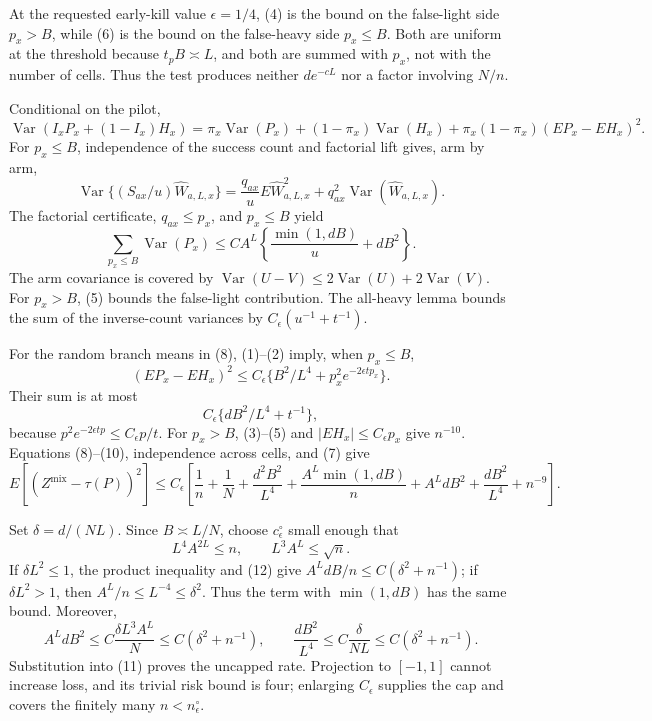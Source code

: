 At the requested early-kill value \(\epsilon=1/4\), (4) is the bound on the false-light side \(p_x>B\), while (6) is the bound on the false-heavy side \(p_x\le B\).  Both are uniform at the threshold because \(t_pB\asymp L\), and both are summed with \(p_x\), not with the number of cells.  Thus the test produces neither \(d e^{-cL}\) nor a factor involving \(N/n\).

Conditional on the pilot,
\[
 \operatorname{Var}(I_xP_x+(1-I_x)H_x)
 =\pi_x\operatorname{Var}(P_x)+(1-\pi_x)\operatorname{Var}(H_x)
 +\pi_x(1-\pi_x)(EP_x-EH_x)^2. \tag{8}
\]
For \(p_x\le B\), independence of the success count and factorial lift gives, arm by arm,
\[
 \operatorname{Var}\{(S_{ax}/u)\widehat W_{a,L,x}\}
 =\frac{q_{ax}}uE\widehat W_{a,L,x}^2
 +q_{ax}^2\operatorname{Var}(\widehat W_{a,L,x}).
\]
The factorial certificate, \(q_{ax}\le p_x\), and \(p_x\le B\) yield
\[
 \sum_{p_x\le B}\operatorname{Var}(P_x)
 \le C A^L\left\{\frac{\min(1,dB)}u+dB^2\right\}. \tag{9}
\]
The arm covariance is covered by \(\operatorname{Var}(U-V)\le2\operatorname{Var}(U)+2\operatorname{Var}(V)\).  For \(p_x>B\), (5) bounds the false-light contribution.  The all-heavy lemma bounds the sum of the inverse-count variances by \(C_\epsilon(u^{-1}+t^{-1})\).

For the random branch means in (8), (1)--(2) imply, when \(p_x\le B\),
\[
 (EP_x-EH_x)^2\le C_\epsilon\{B^2/L^4+p_x^2e^{-2\epsilon tp_x}\}.
\]
Their sum is at most
\[
 C_\epsilon\{dB^2/L^4+t^{-1}\}, \tag{10}
\]
because \(p^2e^{-2\epsilon tp}\le C_\epsilon p/t\).  For \(p_x>B\), (3)--(5) and \(|EH_x|\le C_\epsilon p_x\) give \(n^{-10}\).  Equations (8)--(10), independence across cells, and (7) give
\[
 E[(Z^{\mathrm{mix}}-\tau(P))^2]
 \le C_\epsilon\left[
 \frac1n+\frac1N+\frac{d^2B^2}{L^4}
 +\frac{A^L\min(1,dB)}n+A^LdB^2+\frac{dB^2}{L^4}+n^{-9}
 \right]. \tag{11}
\]

Set \(\delta=d/(NL)\).  Since \(B\asymp L/N\), choose \(c_\epsilon^\circ\) small enough that
\[
 L^4A^{2L}\le n,
 \qquad L^3A^L\le\sqrt n. \tag{12}
\]
If \(\delta L^2\le1\), the product inequality and (12) give \(A^LdB/n\le C(\delta^2+n^{-1})\); if \(\delta L^2>1\), then \(A^L/n\le L^{-4}\le\delta^2\).  Thus the term with \(\min(1,dB)\) has the same bound.  Moreover,
\[
 A^LdB^2\le C\frac{\delta L^3A^L}{N}\le C(\delta^2+n^{-1}),
 \qquad
 \frac{dB^2}{L^4}\le C\frac{\delta}{NL}\le C(\delta^2+n^{-1}).
\]
Substitution into (11) proves the uncapped rate.  Projection to \([-1,1]\) cannot increase loss, and its trivial risk bound is four; enlarging \(C_\epsilon\) supplies the cap and covers the finitely many \(n<n_\epsilon^\circ\).

